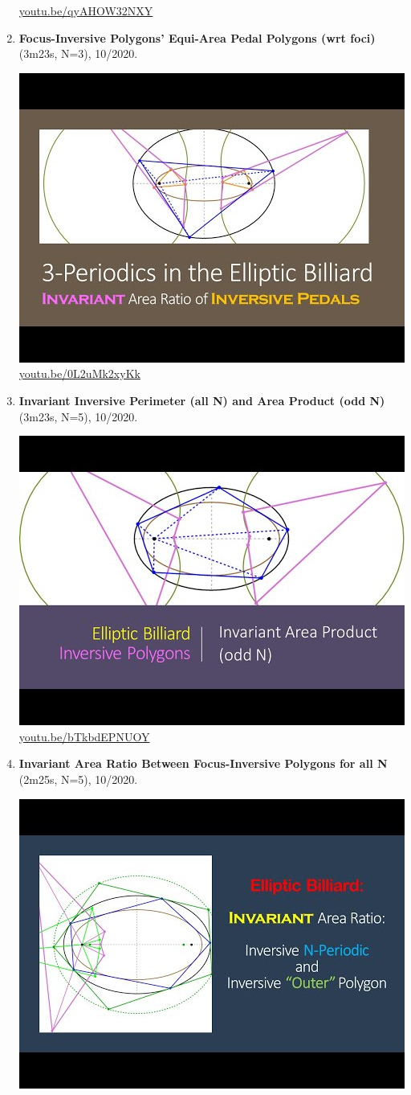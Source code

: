 \documentclass[12pt]{amsart}
\begin{document}
\begin{enumerate}[resume]
\begin{center}
\href{https://youtu.be/qyAHOW32NXY}{\url{youtu.be/qyAHOW32NXY}}\end{center}
% 
\item \textbf{Focus-Inversive Polygons' Equi-Area Pedal Polygons (wrt foci)} (3m23s, N=3), 10/2020. 
\begin{center}\includegraphics[width=.5\textwidth]{pics/0L2uMk2xyKk.jpg} \\ 
\href{https://youtu.be/0L2uMk2xyKk}{\url{youtu.be/0L2uMk2xyKk}}\end{center}
% 
\item \textbf{Invariant Inversive Perimeter (all N) and Area Product (odd N)} (3m23s, N=5), 10/2020. 
\begin{center}\includegraphics[width=.5\textwidth]{pics/bTkbdEPNUOY.jpg} \\ 
\href{https://youtu.be/bTkbdEPNUOY}{\url{youtu.be/bTkbdEPNUOY}}\end{center}
% 
\item \textbf{Invariant Area Ratio Between Focus-Inversive Polygons for all N} (2m25s, N=5), 10/2020. 
\begin{center}\includegraphics[width=.5\textwidth]{pics/eG4UCgMkKl8.jpg} \\ 

\end{center}
\end{enumerate}
\end{document}
